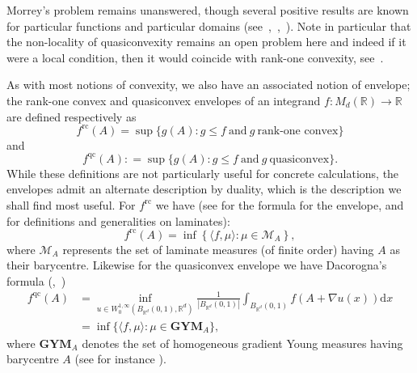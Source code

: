 \documentclass[11pt, a4paper]{amsart}
\theoremstyle{definition}
\theoremstyle{remark}
\newcommand{\R}{\mathbb{R}}
\begin{document}
Morrey's problem remains unanswered, though several
positive results are known for 
particular functions and particular domains
(see~\cite{Harris2018},~\cite{Faraco2008},~\cite
{Muller1999Rank-oneMatrices}).
Note in particular that the non-locality of
quasiconvexity remains an open problem here
and indeed if it were a local condition, then
it would coincide with rank-one convexity,
see~\cite[Theorem 2]{Kristensen1999-Nonlocality}.\par
As with most notions of convexity, we also have 
an associated notion of envelope;
the rank-one convex and quasiconvex envelopes
of an integrand $f\colon M_{d}(\R)\to \mathbb{R}$ 
are defined respectively as
\begin{equation*}
    f^{\mathrm{rc}}(A)=\sup\{g(A)\colon 
    g\le f\ \mathrm{and}\ g\ \text{rank-one convex}\}
\end{equation*}
and
\begin{equation*}
f^{\mathrm{qc}}(A)\mathrel{:}=
\sup\{g(A)\colon  g\le f\ \mathrm{and}\ g\ 
\mathrm{ quasiconvex}\}.
\end{equation*}
While these definitions are not particularly useful
for concrete calculations, 
the envelopes admit an alternate description by duality,
which is the description we shall find most useful.
For $f^{\mathrm{rc}}$ we have (see 
\cite[Theorem 6.10]{Dacorogna2008DirectVariations}
for the formula for the envelope,
\cite{Pedregal1993LaminatesMicrostructure}
and~\cite[Section 9.1]{Rindler} for
definitions and generalities on laminates):
\begin{equation}\label{eq:rcenv}
f^{\mathrm{rc}}(A)
=\inf \left\{\langle f,\mu\rangle\colon
\mu\in\mathcal M_A\right\},
\end{equation}
where $\mathcal M_A$ represents
the set of laminate measures (of finite order) having
$A$ as their barycentre.
Likewise for the quasiconvex envelope
we have Dacorogna's formula
(\cite[Theorem 6.9]
{Dacorogna2008DirectVariations},~\cite[Appendix]
{Kinderlehrer1991CharacterizationsGradients})
\begin{align}
\label{eq:qcenv}
    f^{\mathrm{qc}}(A)
&=
    \underset{
    u\in W^{1,\infty}_0(B_{\mathbb{R}^d}(0,1),
    \mathbb{R}^d)
    }
\inf
    \frac{1}{|B_{\mathbb{R}^d}(0,1)|}
    \int_{B_{\mathbb{R}^d}(0,1)}f(A+\nabla u(x))
    \mathrm{d} x\\ 
    &={\inf}
    \{\langle f,\mu\rangle\colon \mu\in
    \mathbf{GYM}_A\},
\end{align}
where $\mathbf{GYM}_A$ denotes the set of
homogeneous gradient Young measures
having barycentre $A$ (see for instance \cite{Rindler}).
\end{document}
